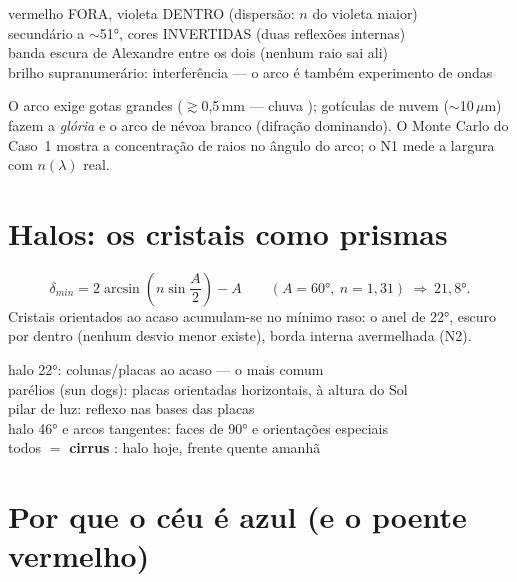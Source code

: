 \documentclass[11pt]{article}
\begin{document}
\begin{noquadro}
vermelho FORA, violeta DENTRO (dispersão: $n$ do violeta maior)\\
secundário a $\sim$51°, cores INVERTIDAS (duas reflexões internas)\\
banda escura de Alexandre entre os dois (nenhum raio sai ali)\\
brilho supranumerário: interferência — o arco é também experimento de
ondas
\end{noquadro}

O arco exige gotas grandes ($\gtrsim$0,5\,mm — chuva
); gotículas de nuvem ($\sim$10\,$\mu$m)
fazem a \emph{glória} e o arco de névoa branco (difração dominando). O
Monte Carlo do Caso~1 mostra a concentração de raios no ângulo do
arco; o N1 mede a largura com $n(\lambda)$ real.

\section{Halos: os cristais como prismas}\label{sec:halo}


\begin{formadif}
\[ \delta_{min} = 2\arcsin\!\left(n\sin\frac{A}{2}\right) - A
\qquad (A = 60°,\ n = 1{,}31)\ \Rightarrow\ 21{,}8°. \]
Cristais orientados ao acaso acumulam-se no mínimo raso: o anel de
22°, escuro por dentro (nenhum desvio menor existe), borda interna
avermelhada (N2).
\end{formadif}

\begin{noquadro}
halo 22°: colunas/placas ao acaso — o mais comum\\
parélios (sun dogs): placas orientadas horizontais, à altura do Sol\\
pilar de luz: reflexo nas bases das placas\\
halo 46° e arcos tangentes: faces de 90° e orientações especiais\\[2pt]
todos $=$ \textbf{cirrus} : halo hoje,
frente quente amanhã 
\end{noquadro}

\section{Por que o céu é azul (e o poente vermelho)}\label{sec:ceu}
\end{document}
